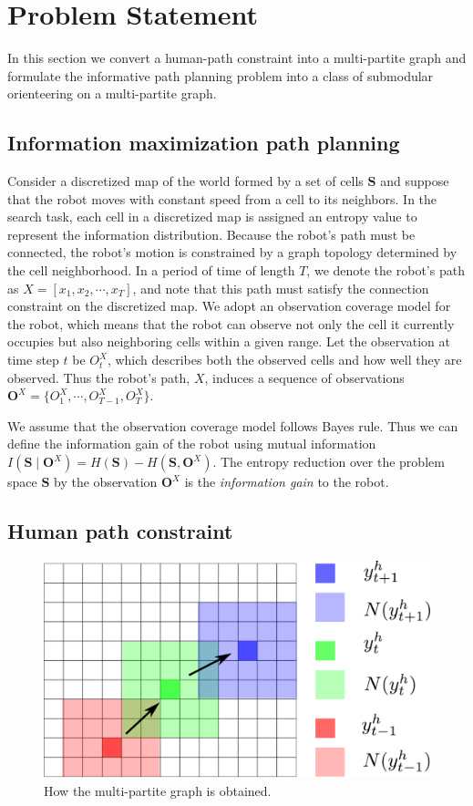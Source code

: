 \section{Problem Statement}
\label{sec:problem}

In this section we convert a human-path constraint into a multi-partite graph and formulate the informative path planning problem into a class of submodular orienteering on a multi-partite graph.

\subsection{Information maximization path planning}

Consider a discretized map of the world formed by a set of cells $ \mathbf{S}$ and suppose that the robot moves with constant speed from a cell to its neighbors.
In the search task, each cell in a discretized map is assigned an entropy value to represent the information distribution.
Because the robot's path must be connected, the robot's motion is constrained by a graph topology determined by the cell neighborhood. 
In a period of time of length $ T $, we denote the robot's path as $ X = [x_{1}, x_{2} , \cdots , x_{T}] $, and note that this path must satisfy the connection constraint on the discretized map.
We adopt an observation coverage model for the robot, which means that the robot can observe not only the cell it currently occupies but also neighboring cells within a given range.
Let the observation at time step $ t $ be $ O^{X}_{t} $, which describes both the observed cells and how well they are observed.
Thus the robot's path, $X$, induces a sequence of observations $ \mathbf{O}^{X} = \{ O^{X}_{1}, \cdots , O^{X}_{T-1}, O^{X}_{T} \}$.

We assume that the observation coverage model follows Bayes rule.
Thus we can define the information gain of the robot using mutual information $ I( \mathbf{S} \mid \mathbf{O}^{X} ) =  H( \mathbf{S} ) - H( \mathbf{S}, \mathbf{O}^{X}  ) $.
The entropy reduction over the problem space $ \mathbf{S} $ by the observation $ \mathbf{O}^{X} $ is the {\em information gain} to the robot.

\subsection{Human path constraint}

\begin{figure}[hbtp]
\centering
\includegraphics[width=0.6\linewidth]{./images/humanConstraint}
\caption{How the multi-partite graph is obtained.}
\label{fig:humanConstraint}
\end{figure}


